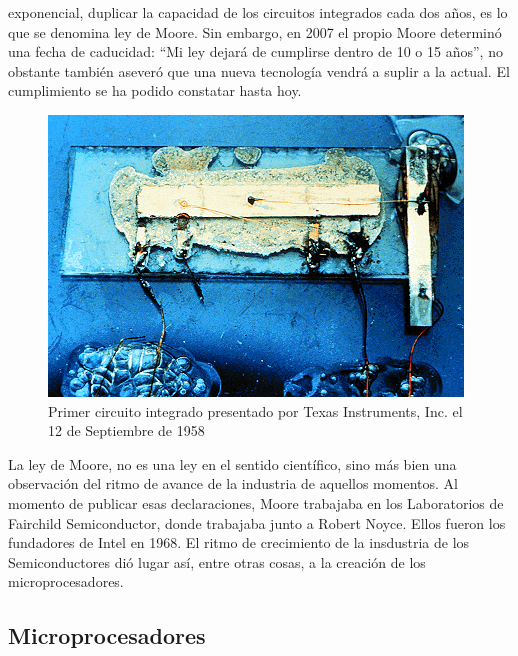 exponencial, duplicar la capacidad de los circuitos integrados cada dos años, es lo que se denomina ley de Moore. Sin embargo, en 2007 el propio Moore determinó una fecha de caducidad: ``Mi ley dejará de cumplirse dentro de 10 o 15 años'', no obstante también aseveró que una nueva tecnología vendrá a suplir a la actual. El cumplimiento se ha podido constatar hasta hoy.

\begin{figure}
  \centering
  \includegraphics[scale=0.5]{./figures/C02-primer_circuito_integrado}
  \captionsetup{justification=centering}
  \caption{Primer circuito integrado presentado por Texas Instruments, Inc. el 12 de Septiembre de 1958}
  \label{fig:C02-primer_circuito_integrado}
\end{figure}

La ley de Moore, no es una ley en el sentido científico, sino más bien una observación del ritmo de avance de la industria de aquellos momentos. Al momento de publicar esas declaraciones, Moore trabajaba en los Laboratorios de Fairchild Semiconductor, donde trabajaba junto a Robert Noyce. Ellos fueron los fundadores de Intel en 1968. El ritmo de crecimiento de la insdustria de los Semiconductores dió lugar así, entre otras cosas, a la creación de los microprocesadores.

\subsection{Microprocesadores}

